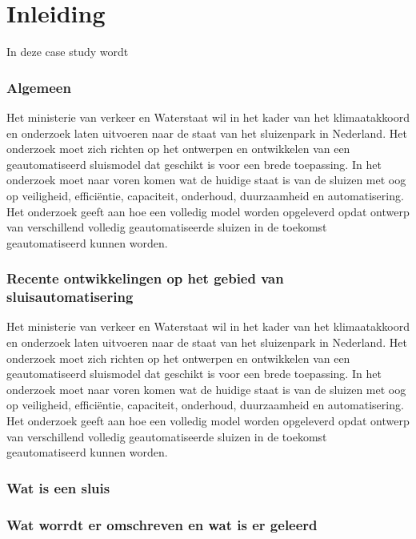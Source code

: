 \newpage
\section{Inleiding}
In deze case study wordt %

\subsubsection{Algemeen}

Het ministerie van verkeer en Waterstaat wil in het kader van het klimaatakkoord en onderzoek laten uitvoeren naar de staat van het sluizenpark in Nederland. Het onderzoek moet zich richten op het ontwerpen en ontwikkelen van een geautomatiseerd sluismodel dat geschikt is voor een brede toepassing. In het onderzoek moet naar voren komen wat de huidige staat is van de sluizen met oog op veiligheid, efficiëntie, capaciteit, onderhoud, duurzaamheid en automatisering. Het onderzoek geeft aan hoe een volledig model worden opgeleverd opdat ontwerp van verschillend volledig geautomatiseerde sluizen in de toekomst geautomatiseerd kunnen worden.  

\subsubsection{Recente ontwikkelingen op het gebied van sluisautomatisering}

Het ministerie van verkeer en Waterstaat wil in het kader van het klimaatakkoord en onderzoek laten uitvoeren naar de staat van het sluizenpark in Nederland. Het onderzoek moet zich richten op het ontwerpen en ontwikkelen van een geautomatiseerd sluismodel dat geschikt is voor een brede toepassing. In het onderzoek moet naar voren komen wat de huidige staat is van de sluizen met oog op veiligheid, efficiëntie, capaciteit, onderhoud, duurzaamheid en automatisering. Het onderzoek geeft aan hoe een volledig model worden opgeleverd opdat ontwerp van verschillend volledig geautomatiseerde sluizen in de toekomst geautomatiseerd kunnen worden.  
\subsubsection{Wat is een sluis}

\subsubsection{Wat worrdt er omschreven en wat is er geleerd}

